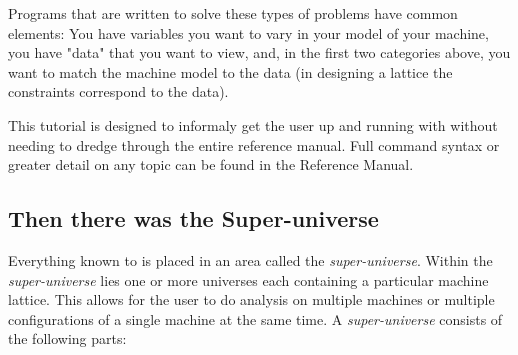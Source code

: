Programs that are written to solve these types of problems have common
elements: You have variables you want to vary in your model of your
machine, you have "data" that you want to view, and, in the first two
categories above, you want to match the machine model to the data (in
designing a lattice the constraints correspond to the data).

This tutorial is designed to informaly get the user up and running with \tao without
needing to dredge through the entire reference manual. Full command syntax
or greater detail on any topic can be found in the Reference Manual.

\subsection{Then there was the Super-universe}

Everything known to \tao is placed in an area called the
\textit{super-universe}. Within the \textit{super-universe} lies one or more
universes each containing a particular machine lattice. This allows for the user
to do analysis on multiple machines or multiple configurations of a single
machine at the same time. A \textit{super-universe} consists of the following
parts:

